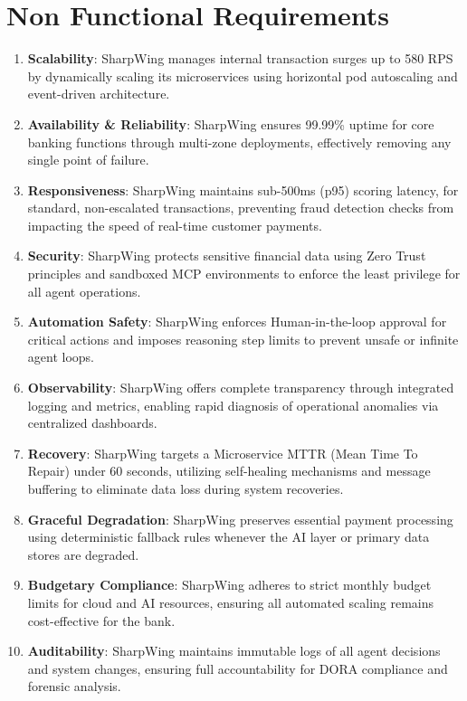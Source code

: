 \documentclass[12pt]{report}
\begin{document}
\section{Non Functional Requirements}\begin{enumerate}

  \item \textbf{Scalability}: SharpWing manages internal transaction surges up to 580 RPS by dynamically scaling its microservices using horizontal pod autoscaling and event-driven architecture.
  
  \item \textbf{Availability \& Reliability}: SharpWing ensures 99.99\% uptime for core banking functions through multi-zone deployments, effectively removing any single point of failure.
  
  \item \textbf{Responsiveness}: SharpWing maintains sub-500ms (p95) scoring latency, for standard, non-escalated transactions, preventing fraud detection checks from impacting the speed of real-time customer payments.
  
  \item \textbf{Security}: SharpWing protects sensitive financial data using Zero Trust principles and sandboxed MCP environments to enforce the least privilege for all agent operations.
  
  \item \textbf{Automation Safety}: SharpWing enforces Human-in-the-loop approval for critical actions and imposes reasoning step limits to prevent unsafe or infinite agent loops.
  
  \item \textbf{Observability}: SharpWing offers complete transparency through integrated logging and metrics, enabling rapid diagnosis of operational anomalies via centralized dashboards.
  
  \item \textbf{Recovery}: SharpWing targets a Microservice MTTR (Mean Time To Repair) under 60 seconds, utilizing self-healing mechanisms and message buffering to eliminate data loss during system recoveries.
  
  \item \textbf{Graceful Degradation}: SharpWing preserves essential payment processing using deterministic fallback rules whenever the AI layer or primary data stores are degraded.
  
  \item \textbf{Budgetary Compliance}: SharpWing adheres to strict monthly budget limits for cloud and AI resources, ensuring all automated scaling remains cost-effective for the bank.
  
  \item \textbf{Auditability}: SharpWing maintains immutable logs of all agent decisions and system changes, ensuring full accountability for DORA compliance and forensic analysis.
\end{enumerate}
\end{document}
